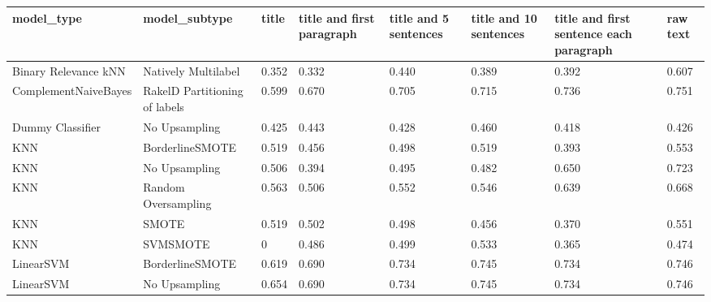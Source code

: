\begin{tabular}{llllllll}
\toprule
                     model\_type &                 model\_subtype & title & title and first paragraph & title and 5 sentences & title and 10 sentences & title and first sentence each paragraph & raw text \\
\midrule
           Binary Relevance kNN &           Natively Multilabel & 0.352 &                     0.332 &                 0.440 &                  0.389 &                                   0.392 &    0.607 \\
           ComplementNaiveBayes & RakelD Partitioning of labels & 0.599 &                     0.670 &                 0.705 &                  0.715 &                                   0.736 &    0.751 \\
               Dummy Classifier &                 No Upsampling & 0.425 &                     0.443 &                 0.428 &                  0.460 &                                   0.418 &    0.426 \\
                            KNN &               BorderlineSMOTE & 0.519 &                     0.456 &                 0.498 &                  0.519 &                                   0.393 &    0.553 \\
                            KNN &                 No Upsampling & 0.506 &                     0.394 &                 0.495 &                  0.482 &                                   0.650 &    0.723 \\
                            KNN &           Random Oversampling & 0.563 &                     0.506 &                 0.552 &                  0.546 &                                   0.639 &    0.668 \\
                            KNN &                         SMOTE & 0.519 &                     0.502 &                 0.498 &                  0.456 &                                   0.370 &    0.551 \\
                            KNN &                      SVMSMOTE &     0 &                     0.486 &                 0.499 &                  0.533 &                                   0.365 &    0.474 \\
                      LinearSVM &               BorderlineSMOTE & 0.619 &                     0.690 &                 0.734 &                  0.745 &                                   0.734 &    0.746 \\
                      LinearSVM &                 No Upsampling & 0.654 &                     0.690 &                 0.734 &                  0.745 &                                   0.734 &    0.746 \\

\end{tabular}
